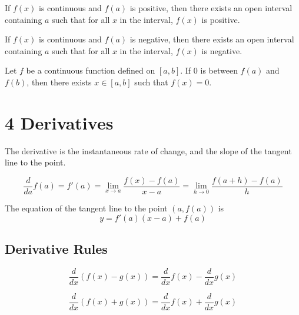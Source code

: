 \begin{namedtheorem}
  If $f(x)$ is continuous and $f(a)$ is positive, then there exists an open interval containing $a$ such that for all $x$ in the interval, $f(x)$ is positive.

  If $f(x)$ is continuous and $f(a)$ is negative, then there exists an open interval containing $a$ such that for all $x$ in the interval, $f(x)$ is negative.
\end{namedtheorem}

\begin{namedtheorem}
  Let $f$ be a continuous function defined on $[a, b]$. If $0$ is between $f (a)$ and $f (b)$, then there exists $x \in [a, b]$ such that $f (x) = 0$.
\end{namedtheorem}

\pagebreak

\section*{4 Derivatives}

The derivative is the instantaneous rate of change, and the slope of the tangent line to the point.

\begin{definition}[Derivative ($f'(a)$)]
  \[
    \frac{d}{da} f(a) = f'(a) = \lim_{x \to a} \frac{f(x)-f(a)}{x - a} = \lim_{h \to 0} \frac{f(a+h)-f(a)}{h}
  \]
\end{definition}

\begin{theorem}
  The equation of the tangent line to the point $(a, f(a))$ is
  \[
    y = f'(a)(x-a) + f(a)
  \]
\end{theorem}

\subsection*{Derivative Rules}

\begin{theorem}
  \[
    \frac{d}{dx}(f(x) - g(x)) = \frac{d}{dx}f(x) - \frac{d}{dx}g(x)
  \]
\end{theorem}

\begin{theorem}
  \[
    \frac{d}{dx}(f(x) + g(x)) = \frac{d}{dx}f(x) + \frac{d}{dx}g(x)
  \]
\end{theorem}

